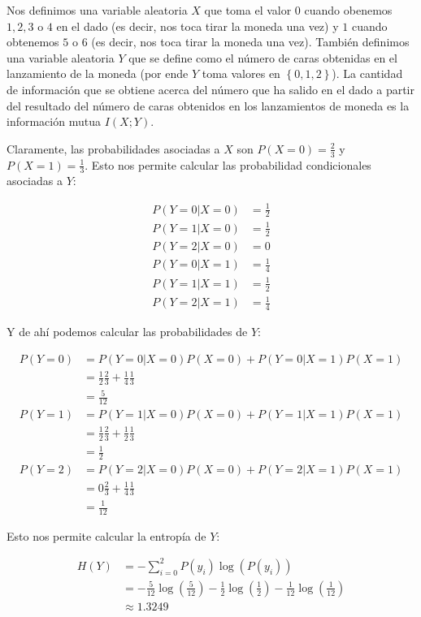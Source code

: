 \documentclass{article}
\begin{document}
\vspace{0.5cm}

Nos definimos una variable aleatoria $X$ que toma el valor $0$ cuando obenemos $1,2,3$ o $4$ en el dado (es decir, nos toca tirar la moneda una vez) y $1$ cuando obtenemos $5$ o $6$ (es decir, nos toca tirar la moneda una vez). También definimos una variable aleatoria $Y$ que se define como el número de caras obtenidas en el lanzamiento de la moneda (por ende $Y$ toma valores en $\left\{0,1,2\right\}$). La cantidad de información que se obtiene acerca del número que ha salido en el dado a partir del resultado del número de caras obtenidos en los lanzamientos de moneda es la información mutua $I(X;Y)$.

Claramente, las probabilidades asociadas a $X$ son $P(X=0) = \frac{2}{3}$ y $P(X=1) = \frac{1}{3}$. Esto nos permite calcular las probabilidad condicionales asociadas a $Y$:

\begin{align*}
    P(Y=0|X=0) &= \frac{1}{2}\\
    P(Y=1|X=0) &= \frac{1}{2}\\
    P(Y=2|X=0) &= 0\\
    P(Y=0|X=1) &= \frac{1}{4}\\
    P(Y=1|X=1) &= \frac{1}{2}\\
    P(Y=2|X=1) &= \frac{1}{4}
\end{align*}

Y de ahí podemos calcular las probabilidades de $Y$:

\begin{align*}
    P(Y=0) &= P(Y=0|X=0)P(X=0) + P(Y=0|X=1)P(X=1)\\
    &= \frac{1}{2}\frac{2}{3} + \frac{1}{4}\frac{1}{3}\\
    &= \frac{5}{12}\\
    P(Y=1) &= P(Y=1|X=0)P(X=0) + P(Y=1|X=1)P(X=1)\\
    &= \frac{1}{2}\frac{2}{3} + \frac{1}{2}\frac{1}{3}\\
    &= \frac{1}{2}\\
    P(Y=2) &= P(Y=2|X=0)P(X=0) + P(Y=2|X=1)P(X=1)\\
    &= 0\frac{2}{3} + \frac{1}{4}\frac{1}{3}\\
    &= \frac{1}{12}
\end{align*}

Esto nos permite calcular la entropía de $Y$:

\begin{align*}
    H(Y) &= -\sum_{i=0}^{2}P(y_i)\log\left(P(y_i)\right)\\
    &= -\frac{5}{12}\log\left(\frac{5}{12}\right) - \frac{1}{2}\log\left(\frac{1}{2}\right) - \frac{1}{12}\log\left(\frac{1}{12}\right)\\
    &\approx 1.3249
\end{align*}
\end{document}
